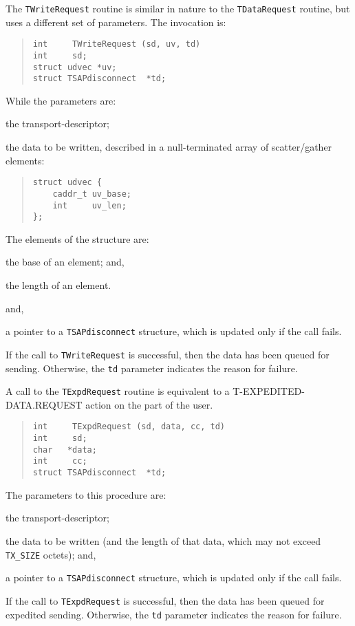 The \verb"TWriteRequest" routine is similar in nature to the
\verb"TDataRequest" routine,
but uses a different set of parameters.
The invocation is:
\begin{quote}\small\begin{verbatim}
int     TWriteRequest (sd, uv, td)
int     sd;
struct udvec *uv;
struct TSAPdisconnect  *td;
\end{verbatim}\end{quote}
While the parameters are:
\begin{describe}
\item[\verb"sd":] the transport-descriptor;

\item[\verb"uv":] the data to be written,
described in a null-terminated array of scatter/gather elements:
\begin{quote}\small\begin{verbatim}
struct udvec {
    caddr_t uv_base;
    int     uv_len;
};
\end{verbatim}\end{quote}
    The elements of the structure are:
    \begin{describe}
    \item[\verb"uv\_base":] the base of an element; and,
    \item[\verb"uv\_cc":] the length of an element.
    \end{describe}
and,

\item[\verb"td":] a pointer to a \verb"TSAPdisconnect" structure, which is
updated only if the call fails.
\end{describe}
If the call to \verb"TWriteRequest" is successful,
then the data has been queued for sending.
Otherwise,
the \verb"td" parameter indicates the reason for failure.

A call to the \verb"TExpdRequest" routine is equivalent to a
{\sf T-EXPEDITED-DATA.REQUEST\/} action on the part of the user.
\begin{quote}\small\begin{verbatim}
int     TExpdRequest (sd, data, cc, td)
int     sd;
char   *data;
int     cc;
struct TSAPdisconnect  *td;
\end{verbatim}\end{quote}
The parameters to this procedure are:
\begin{describe}
\item[\verb"sd":] the transport-descriptor;

\item[\verb"data"/\verb"cc":] the data to be written
(and the length of that data, which may not exceed \verb"TX_SIZE" octets);
and,

\item[\verb"td":] a pointer to a \verb"TSAPdisconnect" structure, which is
updated only if the call fails.
\end{describe}
If the call to \verb"TExpdRequest" is successful,
then the data has been queued for expedited sending.
Otherwise,
the \verb"td" parameter indicates the reason for failure.

